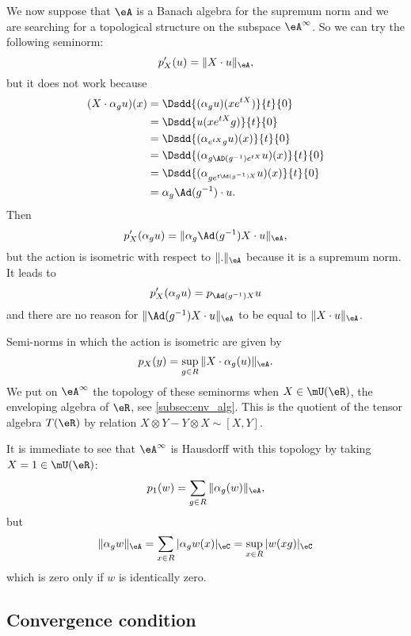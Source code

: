 We now suppose that $\eA$ is a Banach algebra for the supremum norm and we are searching for a topological structure on the subspace $\eA^{\infty}$. So we can try the following seminorm:
\begin{equation}
   p'_X(u)=\| X\cdot u \|_{\eA},
\end{equation}
but it does not work because
\begin{equation}
\begin{split}
  (X\cdot \alpha_gu)(x)&=\Dsdd{ (\alpha_gu)(xe^{tX}) }{t}{0}\\
		&=\Dsdd{ u(xe^{tX}g) }{t}{0}\\
		&=\Dsdd{ (\alpha_{e^{tX}g}u)(x) }{t}{0}\\
		&=\Dsdd{ (\alpha_{g\AD(g^{-1})e^{tX}}u)(x) }{t}{0}\\
		&=\Dsdd{ (\alpha_{ge^{t\Ad(g^{-1})X}}u)(x) }{t}{0}\\
		&=\alpha_g\Ad(g^{-1})\cdot u.
\end{split}
\end{equation}
Then
\[ 
  p'_X(\alpha_gu)=\| \alpha_g\Ad(g^{-1})X\cdot u \|_{\eA},
\]
but the action is isometric with respect to $\| . \|_{\eA}$ because it is a supremum norm. It leads to
\[ 
  p'_X(\alpha_gu)=p_{\Ad(g^{-1})X}u
\]
and there are no reason for $\| \Ad(g^{-1})X\cdot u \|_{\eA}$ to be equal to $\| X\cdot u \|_{\eA}$.

Semi-norms in which the action is isometric are given by
\begin{equation}
  p_X(y)=\sup_{g\in R}\| X\cdot \alpha_g(u) \|_{\eA}.
\end{equation}
We put on $\eA^{\infty}$ the topology of these seminorms when $X\in\mU(\eR)$, the enveloping algebra of $\eR$, see \ref{subsec:env_alg}. This is the quotient of the tensor algebra $T(\eR)$ by relation $X\otimes Y-Y\otimes X\sim [X,Y]$.

It is immediate to see that $\eA^{\infty}$ is Hausdorff with this topology by taking $X=1\in\mU(\eR)$:
\[ 
  p_1(w)=\sum_{g\in R}\| \alpha_g(w) \|_{\eA},
\]
but
\begin{equation}
   \| \alpha_g w \|_{\eA}=\sum_{x\in R}| \alpha_g w(x) |_{\eC}
		=\sup_{x\in R}| w(xg) |_{\eC}
\end{equation}
which is zero only if $w$ is identically zero.



\subsection{Convergence condition}

